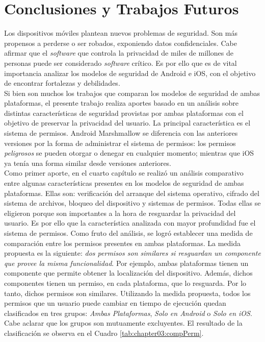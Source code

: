 \chapter{Conclusiones y Trabajos Futuros}
Los dispositivos móviles plantean nuevos problemas de seguridad. Son más propensos a perderse o ser robados, exponiendo datos confidenciales. Cabe afirmar que el \emph{software} que controla la privacidad de miles de millones de personas puede ser considerado \emph{software} crítico. Es por ello que es de vital importancia analizar los modelos de seguridad de Android e iOS, con el objetivo de encontrar fortalezas y debilidades.\\

Si bien son muchos los trabajos que comparan los modelos de seguridad de ambas plataformas, el presente trabajo realiza aportes basado en un análisis sobre distintas características de seguridad provistas por ambas plataformas con el objetivo de preservar la privacidad del usuario. La principal característica es el sistema de permisos. Android Marshmallow se diferencia con las anteriores versiones por la forma de administrar el sistema de permisos: los permisos \emph{peligrosos} se pueden otorgar o denegar en cualquier momento; mientras que iOS ya tenía una forma similar desde versiones anteriores.\\

Como primer aporte, en el cuarto capítulo se realizó un análisis comparativo entre algunas características presentes en los modelos de seguridad de ambas plataformas. Ellas son: verificación del arranque del sistema operativo, cifrado del sistema de archivos, bloqueo del dispositivo y sistemas de permisos. Todas ellas se eligieron porque son importantes a la hora de resguardar la privacidad del usuario. Es por ello que la característica analizada con mayor profundidad fue el sistema de permisos. Como fruto del análisis, se logró establecer una medida de comparación entre los permisos presentes en ambas plataformas. La medida propuesta es la siguiente: \emph{dos permisos son similares si resguardan un componente que provee la misma funcionalidad}. Por ejemplo, ambas plataformas tienen un componente que permite obtener la localización del dispositivo. Además, dichos componentes tienen un permiso, en cada plataforma, que lo resguarda. Por lo tanto, dichos permisos son similares. Utilizando la medida propuesta, todos los permisos que un usuario puede cambiar en tiempo de ejecución quedan clasificados en tres grupos: \emph{Ambas Plataformas}, \emph{Solo en Android} o \emph{Solo en iOS}. Cabe aclarar que los grupos son mutuamente excluyentes. El resultado de la clasificación se observa en el Cuadro \ref{tab:chapter03:compPerm}.\\


